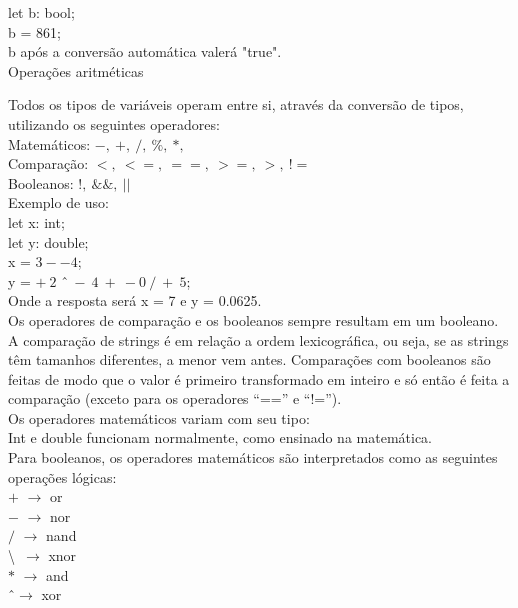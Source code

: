 \documentclass[12pt,a4paper]{article}
\begin{document}
let b: bool; \\

b = 861;\\

b após a conversão automática valerá "true".\\

\hypertarget{label3}{\Large{Operações aritméticas}}\\[0.3cm]
\normalsize

Todos os tipos de variáveis operam entre si, através da conversão de tipos, utilizando os seguintes operadores:\\[0.2cm]
Matemáticos: $-,\ +,\ /,\ \%,\ *,$ \^\\
Comparação: $<,\ <=,\ ==,\ >=,\ >,\ !=$\\
Booleanos: $!,\ \&\&,\ ||$\\[0.6cm]
Exemplo de uso:\\[0.3cm]
let x: int;\\
let y: double;\\

x = $3--4$;\\

y = $+\ 2$ \^\ $\ -\ 4\ +\ -0\ /\ +\ 5$;\\[0.5cm]
Onde a resposta será x = 7 e y = 0.0625.\\


Os operadores de comparação e os booleanos sempre resultam em um booleano. A comparação de strings é em relação a ordem lexicográfica, ou seja, se as strings têm tamanhos diferentes, a menor vem antes. Comparações com booleanos são feitas de modo que o valor é primeiro transformado em inteiro e só então é feita a comparação (exceto para os operadores ``=='' e ``!='').\\

Os operadores matemáticos variam com seu tipo:\\
Int e double funcionam normalmente, como ensinado na matemática.\\

Para booleanos, os operadores matemáticos são interpretados como as seguintes operações lógicas:\\[0.2cm]
$+$ $\rightarrow$ or\\
$-$ $\rightarrow$ nor\\
$/$ $\rightarrow$ nand\\
\textbackslash\ $\rightarrow$ xnor\\
$*$ $\rightarrow$ and\\
\^ \ $\rightarrow$ xor\\
\end{document}
